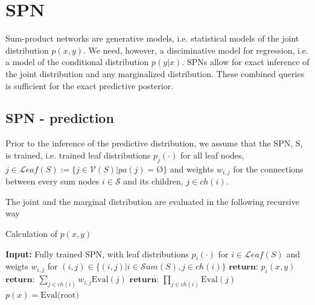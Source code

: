 \section{SPN}
Sum-product networks are generative models, i.e. statistical models of the joint distribution $p(x,y)$. 
We need, however, a disciminative model for regression, i.e. 
a model of the conditional distribution $p(y|x)$. 
SPNs allow for exact inference of the joint distribution 
and any marginalized distribution. These combined queries is sufficient for the
exact predictive posterior. 

\subsection{SPN - prediction}
Prior to the inference of the predictive distribution, we assume that the SPN, S, is trained, i.e.
trained leaf distributions $p_j(\cdot)$ for all leaf nodes, 
$j \in \mathcal{L}eaf(S):=\{j \in \mathcal{V}(S) |pa(j) = \text{Ø}\}$ and
weights $w_{i,j}$ for the connections between every sum nodes
$i \in \mathcal{S}$ and its children, $j \in ch(i)$.  

The joint and the marginal distribution are evaluated in the following recursive way
\begin{algorithm}
    \caption*{Calculation of $p(x,y)$}\label{SPN_1}
    \begin{algorithmic}
    \State \textbf{Input:} Fully trained SPN, with leaf distributions $p_i(\cdot)$ for $i\in \mathcal{L}eaf(S)$ and weigts 
    $w_{i,j}$ for $(i,j) \in \{(i,j)|i \in \mathcal{S}um(S), j \in ch(i)\}$ 
        \State  $\textbf{return: } p_i(x,y)$ 
    \EndIf
        \State $\textbf{return: } \sum_{j\in ch(i)} w_{i,j} \text{Eval}(j)$
    \EndIf
        \State $\textbf{return: } \prod_{j \in ch(i)} \text{Eval}(j)$
    \EndIf
    \EndFunction
    \State $p(x) =  \text{Eval(root)}$
    \end{algorithmic}
\end{algorithm}

